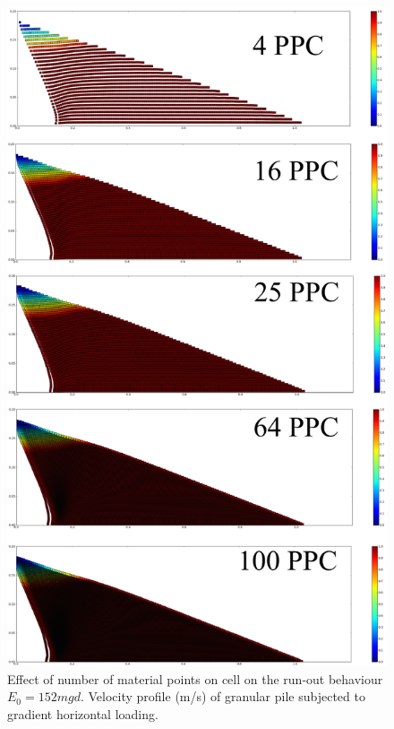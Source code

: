 \begin{figure}[tbhp]
\centering
\includegraphics[height=\textheight]{MPM_500ppc}
\caption{Effect of number of material points on cell on the run-out behaviour 
$E_0=152mgd$. 
Velocity profile (\si{\m/\s}) of granular pile subjected to gradient horizontal 
loading.}
\label{fig:MPM_500ppc}
\end{figure}

